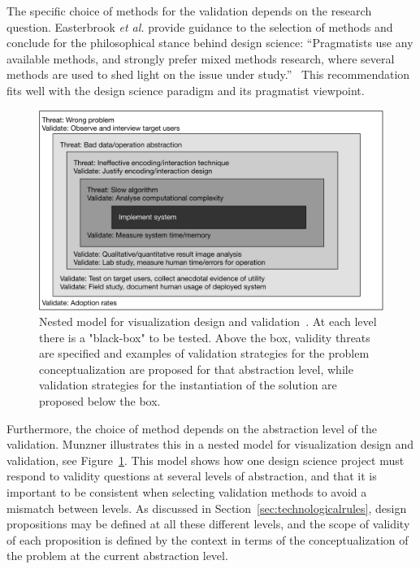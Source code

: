 \documentclass[graybox]{svmult}
\begin{document}
The specific choice of methods for the validation depends on the research question. Easterbrook \emph{et al.} provide guidance to the selection of methods and conclude for the philosophical stance behind design science: ``Pragmatists use any available methods, and strongly prefer mixed methods research, where several methods are used to shed light on the issue under study.''~\cite{easterbrook_selecting_2008} 
This recommendation fits well with the design science paradigm and its pragmatist viewpoint.

\begin{figure}[t]
  \includegraphics[width=\textwidth]{Figures/nested_model.pdf}
\caption{Nested model for visualization design and validation~\cite{munzner2009}. At each level there is a "black-box" to be tested. Above the box, validity threats are specified and examples of validation strategies for the problem conceptualization are proposed for that abstraction level, while validation strategies for the instantiation of the solution are proposed below the box.}\label{fig:nested_model}       %
\end{figure} 

Furthermore, the choice of method depends on the abstraction level of the validation. Munzner illustrates this in a nested model for visualization design and validation, see Figure~\ref{fig:nested_model}. This model shows how one design science project must respond to validity questions at several levels of abstraction, and that it is important to be consistent when selecting validation methods to avoid a mismatch between levels. As discussed in Section~\ref{sec:technologicalrules}, design propositions may be defined at all these different levels, and the scope of validity of each proposition is defined by the context in terms of the conceptualization of the problem at the current abstraction level.
\end{document}

